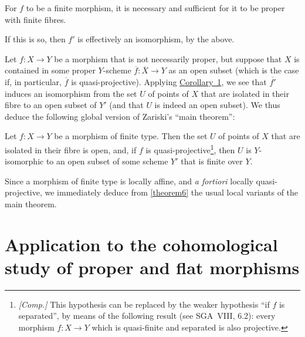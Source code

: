\documentclass{article}
\theoremstyle{plain}
\newenvironment{theorem}[1]
  {\renewcommand\theinnercustomtheorem{#1}\innercustomtheorem}
  {\endinnercustomtheorem}
\newenvironment{corollary}[1]
  {\renewcommand\theinnercustomcorollary{#1}\innercustomcorollary}
  {\endinnercustomcorollary}
\theoremstyle{definition}
\begin{document}
\begin{corollary}{2}
\label{theorem5corollary2}
  For $f$ to be a finite morphism, it is necessary and sufficient for it to be proper with finite fibres.
\end{corollary}

If this is so, then $f'$ is effectively an isomorphism, by the above.

Let $f\colon X\to Y$ be a morphism that is not necessarily proper, but suppose that $X$ is contained in some proper $Y$-scheme $\overline{f}\colon\overline{X}\to Y$ as an open subset (which is the case if, in particular, $\overline{f}$ is quasi-projective).
Applying \hyperref[theorem5corollary1]{Corollary~1}, we see that $\overline{f'}$ induces an isomorphism from the set $U$ of points of $X$ that are isolated in their fibre to an open subset of $Y'$ (and that $U$ is indeed an open subset).
We thus deduce the following global version of Zariski's ``main theorem'':

\begin{theorem}{6}
\label{theorem6}
  Let $f\colon X\to Y$ be a morphism of finite type.
  Then the set $U$ of points of $X$ that are isolated in their fibre is open, and, if $f$ is quasi-projective\footnote{\emph{[Comp.]} This hypothesis can be replaced by the weaker hypothesis ``if $f$ is separated'', by means of the following result (see SGA~VIII, 6.2): every morphism $f\colon X\to Y$ which is quasi-finite and separated is also projective.}, then $U$ is $Y$-isomorphic to an open subset of some scheme $Y'$ that is finite over $Y$.
\end{theorem}

Since a morphism of finite type is locally affine, and \emph{a fortiori} locally quasi-projective, we immediately deduce from \cref{theorem6} the usual local variants of the main theorem.


\section{Application to the cohomological study of proper and flat morphisms}
\label{section5}
\end{document}
